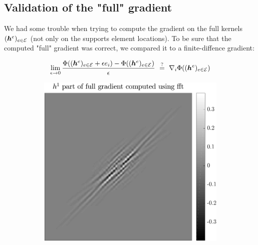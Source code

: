 \subsection{Validation of the "full" gradient}
We had some trouble when trying to compute the gradient on the full kernels $(\bm{h}^e)_{e \in \mathcal E}$ (not only on the supports element locations). To be sure that the computed "full" gradient was correct, we compared it to a finite-diffence gradient:

$$\lim_{\epsilon \rightarrow 0} \frac{\Phi((\bm{h}^e)_{e \in \mathcal E}+\epsilon e_i) - \Phi ((\bm{h}^e)_{e \in \mathcal E}) }{\epsilon} ~\overset{?}{=}~ \nabla_i \Phi ((\bm{h}^e)_{e \in \mathcal E})$$

\begin{figure}[!ht]\centering
\begin{subfigure}[b]{0.30\textwidth}\centering
\includegraphics[width=\textwidth]{figures/verif_gradient/gradient.pdf}
\end{subfigure}
\begin{subfigure}[b]{0.30\textwidth}\centering

\end{subfigure}
\end{figure}
